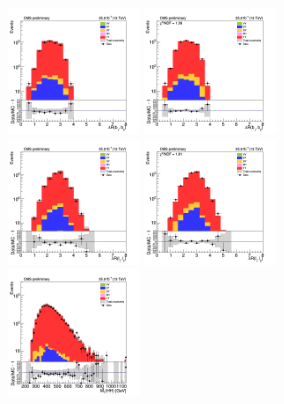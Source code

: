 
\begin{figure}[tbp]
  \begin{center}
    \includegraphics[width=0.31\textwidth]{figures/mm_300_april18/dR_bjets_mm_CRTT_prefit_plot_apr18.png}
    \includegraphics[width=0.31\textwidth]{figures/mm_300_april18/dR_bjets_mm_CRTT_FullPostfit_plot_apr18.png}\\
    \includegraphics[width=0.31\textwidth]{figures/mm_300_april18/dR_leps_mm_CRTT_prefit_plot_apr18.png}
    \includegraphics[width=0.31\textwidth]{figures/mm_300_april18/dR_leps_mm_CRTT_FullPostfit_plot_apr18.png}\\
    \includegraphics[width=0.31\textwidth]{figures/mm_300_april18/hhMt_mm_CRTT_prefit_plot_apr18.png}

\end{center}
\end{figure}
